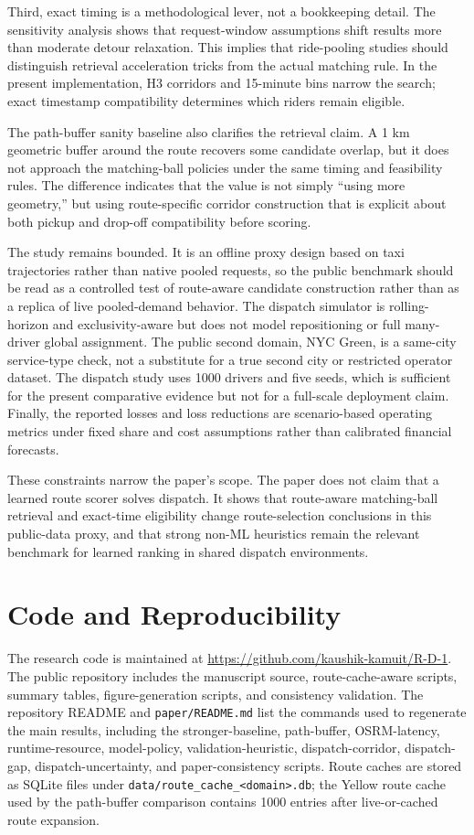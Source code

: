 \documentclass[journal]{IEEEtran}
\begin{document}
Third, exact timing is a methodological lever, not a bookkeeping detail. The sensitivity analysis shows that request-window assumptions shift results more than moderate detour relaxation. This implies that ride-pooling studies should distinguish retrieval acceleration tricks from the actual matching rule. In the present implementation, H3 corridors and 15-minute bins narrow the search; exact timestamp compatibility determines which riders remain eligible.

The path-buffer sanity baseline also clarifies the retrieval claim. A 1 km geometric buffer around the route recovers some candidate overlap, but it does not approach the matching-ball policies under the same timing and feasibility rules. The difference indicates that the value is not simply ``using more geometry,'' but using route-specific corridor construction that is explicit about both pickup and drop-off compatibility before scoring.

The study remains bounded. It is an offline proxy design based on taxi trajectories rather than native pooled requests, so the public benchmark should be read as a controlled test of route-aware candidate construction rather than as a replica of live pooled-demand behavior. The dispatch simulator is rolling-horizon and exclusivity-aware but does not model repositioning or full many-driver global assignment. The public second domain, NYC Green, is a same-city service-type check, not a substitute for a true second city or restricted operator dataset. The dispatch study uses 1000 drivers and five seeds, which is sufficient for the present comparative evidence but not for a full-scale deployment claim. Finally, the reported losses and loss reductions are scenario-based operating metrics under fixed share and cost assumptions rather than calibrated financial forecasts.

These constraints narrow the paper's scope. The paper does not claim that a learned route scorer solves dispatch. It shows that route-aware matching-ball retrieval and exact-time eligibility change route-selection conclusions in this public-data proxy, and that strong non-ML heuristics remain the relevant benchmark for learned ranking in shared dispatch environments.

\section{Code and Reproducibility}
The research code is maintained at \url{https://github.com/kaushik-kamuit/R-D-1}. The public repository includes the manuscript source, route-cache-aware scripts, summary tables, figure-generation scripts, and consistency validation. The repository README and \texttt{paper/README.md} list the commands used to regenerate the main results, including the stronger-baseline, path-buffer, OSRM-latency, runtime-resource, model-policy, validation-heuristic, dispatch-corridor, dispatch-gap, dispatch-uncertainty, and paper-consistency scripts. Route caches are stored as SQLite files under \texttt{data/route\_cache\_<domain>.db}; the Yellow route cache used by the path-buffer comparison contains 1000 entries after live-or-cached route expansion.
\end{document}
